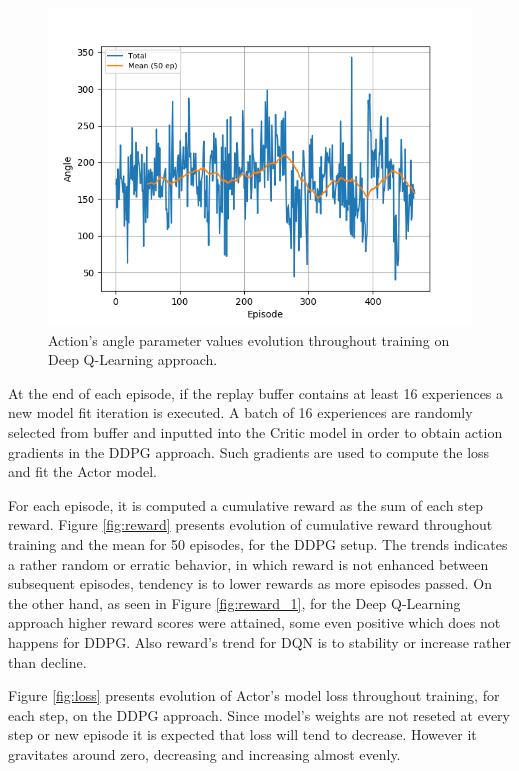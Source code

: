\documentclass[peerreview,onecolumn]{IEEEtran}
\begin{document}
	 
	 \begin{figure}
		\centering
		\includegraphics[scale=0.8]{img/angleDQN.png} 
		\caption{Action's angle parameter values evolution throughout training on Deep Q-Learning approach.}
		\label{fig:angledqn}
	\end{figure}
	 
	  At the end of each episode, if the replay buffer contains at least 16 experiences a new model fit iteration is executed. A batch of 16 experiences are randomly selected from buffer and inputted into the Critic model in order to obtain action gradients in the DDPG approach. Such gradients are used to compute the loss and fit the Actor model.
	  	  
	For each episode, it is computed a cumulative reward as the sum of each step reward. Figure \ref{fig:reward} presents evolution of cumulative reward throughout training and the mean for 50 episodes, for the DDPG setup. The trends indicates a rather random or erratic behavior, in which reward is not enhanced between subsequent episodes, tendency is to lower rewards as more episodes passed. On the other hand, as seen in Figure \ref{fig:reward_1}, for the Deep Q-Learning approach higher reward scores were attained, some even positive which does not happens for DDPG. Also reward's trend for DQN is to stability or increase rather than decline.
	
	
	
	Figure \ref{fig:loss} presents evolution of Actor's model loss throughout training, for each step, on the DDPG approach. Since model's weights are not reseted at every step or new episode it is expected that loss will tend to decrease. However it gravitates around zero, decreasing and increasing almost evenly.
	
\end{document}
